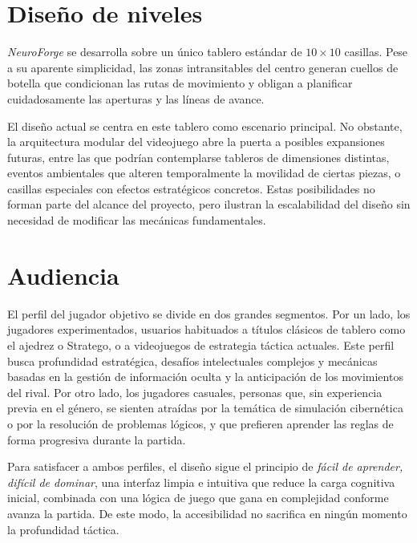 \section{Diseño de niveles}

\textit{NeuroForge} se desarrolla sobre un único tablero estándar de $10 \times 10$ casillas. Pese a su aparente simplicidad, las zonas intransitables del centro generan cuellos de botella que condicionan las rutas de movimiento y obligan a planificar cuidadosamente las aperturas y las líneas de avance.

El diseño actual se centra en este tablero como escenario principal. No obstante, la arquitectura modular del videojuego abre la puerta a posibles expansiones futuras, entre las que podrían contemplarse tableros de dimensiones distintas, eventos ambientales que alteren temporalmente la movilidad de ciertas piezas, o casillas especiales con efectos estratégicos concretos. Estas posibilidades no forman parte del alcance del proyecto, pero ilustran la escalabilidad del diseño sin necesidad de modificar las mecánicas fundamentales.

\section{Audiencia}

El perfil del jugador objetivo se divide en dos grandes segmentos. Por un lado, los jugadores experimentados, usuarios habituados a títulos clásicos de tablero como el ajedrez o Stratego, o a videojuegos de estrategia táctica actuales. Este perfil busca profundidad estratégica, desafíos intelectuales complejos y mecánicas basadas en la gestión de información oculta y la anticipación de los movimientos del rival. Por otro lado, los jugadores casuales, personas que, sin experiencia previa en el género, se sienten atraídas por la temática de simulación cibernética o por la resolución de problemas lógicos, y que prefieren aprender las reglas de forma progresiva durante la partida. 

Para satisfacer a ambos perfiles, el diseño sigue el principio de \textit{fácil de aprender, difícil de dominar}, una interfaz limpia e intuitiva que reduce la carga cognitiva inicial, combinada con una lógica de juego que gana en complejidad conforme avanza la partida. De este modo, la accesibilidad no sacrifica en ningún momento la profundidad táctica.

